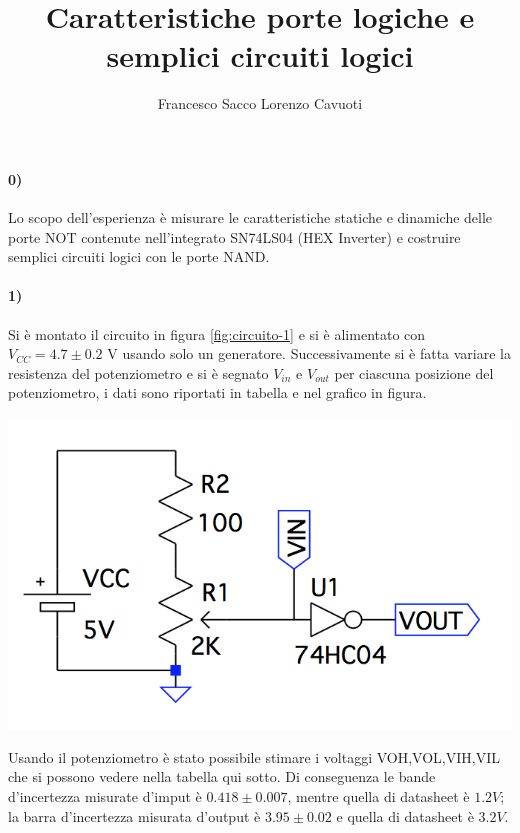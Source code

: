 \documentclass{article}
\date{}
\author{Francesco Sacco Lorenzo Cavuoti}
\title{Caratteristiche porte logiche e semplici circuiti logici}
\begin{document}
\maketitle
\paragraph{0)}
	Lo scopo dell'esperienza è misurare le caratteristiche statiche e dinamiche delle porte NOT contenute nell’integrato SN74LS04 (HEX Inverter) e costruire semplici circuiti logici con le porte NAND.
	
\paragraph{1)}
	Si è montato il circuito in figura \ref{fig:circuito-1} e si è alimentato con $V_{CC}=4.7\pm0.2$ V usando solo un generatore. Successivamente si è fatta variare la resistenza del potenziometro e si è segnato $V_{in}$ e $V_{out}$ per ciascuna posizione del potenziometro, i dati sono riportati in tabella e nel grafico in figura.\newline

	\begin{minipage}{.6\linewidth}
			\centering
			\includegraphics[width=\linewidth]{figure/circuito1}
			\label{fig:circuito-1}
	\end{minipage}
	\begin{minipage}{.4\linewidth}
		
		\label{tab:124}
	\end{minipage}\newline\newline

	Usando il potenziometro è stato possibile stimare i voltaggi VOH,VOL,VIH,VIL che si possono vedere nella tabella qui sotto.\newline
	Di conseguenza le bande d'incertezza misurate d'imput è $0.418\pm0.007$, mentre quella di datasheet è $1.2 V$; la barra d'incertezza misurata d'output è $3.95\pm0.02$ e quella di datasheet è $3.2 V$.
	\begin{center}
		
	\end{center}
\end{document}
